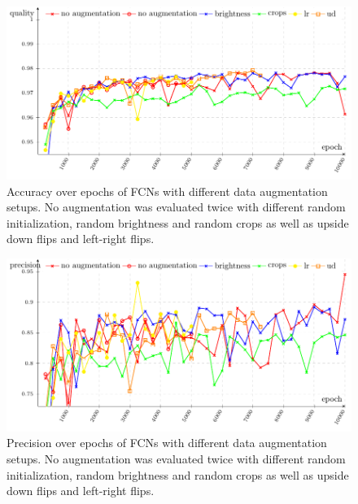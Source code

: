 \begin{appendices}
\begin{figure}[ht]
    \centering
    \includegraphics[width=\linewidth]{csv-line-plot/accuracy-all.pdf}
    \caption{Accuracy over epochs of FCNs with different data augmentation
             setups. No augmentation was evaluated twice with different
             random initialization, random brightness and random crops as
             well as upside down flips and left-right flips.}
    \label{fig:graph-accuracy-all}
\end{figure}


\begin{figure}[ht]
    \centering
    \includegraphics[width=\linewidth]{csv-line-plot/precision-all.pdf}
    \caption{Precision over epochs of FCNs with different data augmentation
             setups. No augmentation was evaluated twice with different
             random initialization, random brightness and random crops as
             well as upside down flips and left-right flips.}
    \label{fig:graph-precision-all}
\end{figure}



\end{appendices}
